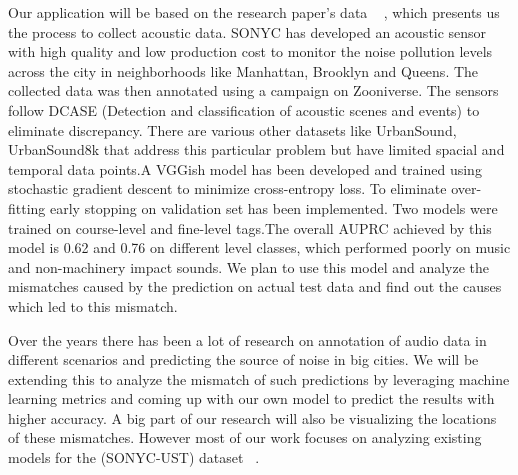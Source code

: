 Our application will be based on the research paper's data ~ \cite{4}, which presents us the process to collect acoustic data. SONYC has developed an acoustic sensor with high quality and low production cost to monitor the noise pollution levels across the city in neighborhoods like Manhattan, Brooklyn and Queens. The collected data was then annotated using a campaign on Zooniverse. The sensors follow DCASE (Detection and classification of acoustic scenes and events) to eliminate discrepancy. There are various other datasets like UrbanSound, UrbanSound8k that address this particular problem but have limited spacial and temporal data points.A VGGish model has been developed and trained using stochastic gradient descent to minimize cross-entropy loss. To eliminate over-fitting early stopping on validation set has been implemented. Two models were trained on course-level and fine-level tags.The overall AUPRC achieved by this model is 0.62 and 0.76 on different level classes, which performed poorly on music and non-machinery impact sounds. We plan to use this model and analyze the mismatches caused by the prediction on actual test data and find out the causes which led to this mismatch. 

Over the years there has been a lot of research on annotation of audio data in different scenarios and predicting the source of noise in big cities. We will be extending this to analyze the mismatch of such predictions by leveraging machine learning metrics and coming up with our own model to predict the results with higher accuracy. A big part of our research will also be visualizing the locations of these mismatches. However most of our work focuses on analyzing existing models for the (SONYC-UST) dataset ~\cite{7}.

